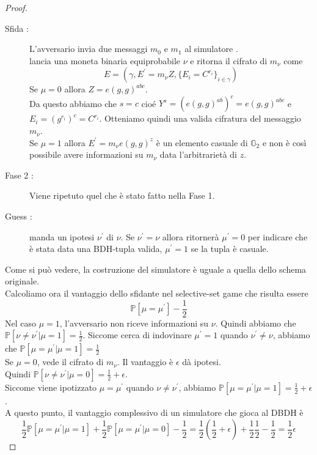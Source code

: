 \begin{thm}
\begin{proof}
\begin{description}
\item[Sfida :] L'avversario  invia due messaggi $m_0$ e $m_1$ al simulatore .\\
 lancia una moneta binaria equiprobabile $\nu$ e ritorna il cifrato di $m_\nu$ come
\[ E = (\gamma , E^\prime = m_\nu Z , \{ E_i = C^{r_i} \}_{i \in \gamma} ) \]
Se $\mu = 0$ allora $Z = e(g,g)^{abc}$.\\
Da questo abbiamo che $s = c$ cioé $Y^s = (e(g,g)^{ab})^c = e(g,g)^{abc}$ e $E_i = (g^{r_i})^c = C^{r_i}$. Otteniamo quindi una valida cifratura del messaggio $m_\nu$.\\
Se $\mu = 1$ allora $E^\prime = m_\nu e(g,g)^z$ è un elemento casuale di $\mathbb{G}_2$ e non è così possibile avere informazioni su $m_\nu$ data l'arbitrarietà di $z$.
\item[Fase 2 :] Viene ripetuto quel che è stato fatto nella Fase 1.
\item[Guess :]  manda un ipotesi $\nu^\prime$ di $\nu$. Se $\nu^\prime = \nu$ allora  ritornerà $\mu^\prime = 0$ per indicare che è stata data una BDH-tupla valida, $\mu^\prime = 1$ se la tupla è casuale.
\end{description}

Come si può vedere, la costruzione del simulatore è uguale a quella dello schema originale.\\[0.5cm]

Calcoliamo ora il vantaggio dello sfidante nel selective-set game che risulta essere
\[\mathbb{P}[ \mu = \mu^\prime] - \frac{1}{2} \]
Nel caso $\mu = 1$, l'avversario non riceve informazioni su $\nu$.
Quindi abbiamo che $\mathbb{P}[\nu \neq \nu^\prime | \mu = 1] = \frac{1}{2}$.
Siccome  cerca di indovinare $\mu^\prime = 1$ quando $\nu^\prime \neq \nu$, abbiamo che $\mathbb{P}[\mu = \mu^\prime| \mu = 1] = \frac{1}{2}$\\
Se $\mu = 0$,  vede il cifrato di $m_\nu$. Il vantaggio è $\epsilon$ dà ipotesi.\\
Quindi $\mathbb{P}[\nu \neq \nu^\prime | \mu = 0] = \frac{1}{2} + \epsilon$.\\
Siccome viene ipotizzato $ \mu = \mu^\prime$ quando $\nu \neq \nu^\prime$, abbiamo $\mathbb{P}[\mu = \mu^\prime | \mu = 1] = \frac{1}{2} + \epsilon$.\\
A questo punto, il vantaggio complessivo di un simulatore che gioca al DBDH è 
\[ \frac{1}{2} \mathbb{P}[\mu = \mu^\prime | \mu = 1] + \frac{1}{2}\mathbb{P}[\mu = \mu^\prime | \mu = 0] - \frac{1}{2}  = \frac{1}{2}\left( \frac{1}{2} + \epsilon \right) + \frac{1}{2}\frac{1}{2} - \frac{1}{2} = \frac{1}{2} \epsilon\]
\end{proof}
\end{thm}

